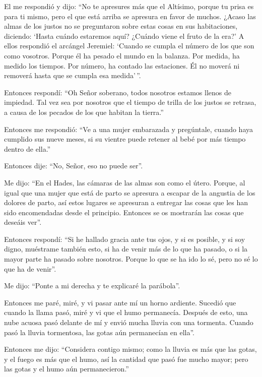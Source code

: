  El me respondió y dijo: ``No te apresures más que el
Altísimo, porque tu prisa es para ti mismo, pero el que está arriba se
apresura en favor de muchos.  ¿Acaso las almas de los
justos no se preguntaron sobre estas cosas en sus habitaciones,
diciendo: `Hasta cuándo estaremos aquí? ¿Cuándo viene el fruto de la
era?'  A ellos respondió el arcángel Jeremiel: `Cuando se
cumpla el número de los que son como vosotros. Porque él ha pesado el
mundo en la balanza.  Por medida, ha medido los tiempos.
Por número, ha contado las estaciones. Él no moverá ni removerá hasta
que se cumpla esa medida'\,''.

 Entonces respondí: ``Oh Señor soberano, todos nosotros
estamos llenos de impiedad.  Tal vez sea por nosotros que
el tiempo de trilla de los justos se retrasa, a causa de los pecados de
los que habitan la tierra.''

 Entonces me respondió: ``Ve a una mujer embarazada y
pregúntale, cuando haya cumplido sus nueve meses, si su vientre puede
retener al bebé por más tiempo dentro de ella.''

 Entonces dije: ``No, Señor, eso no puede ser''.

Me dijo: ``En el Hades, las cámaras de las almas son como el útero.
 Porque, al igual que una mujer que está de parto se
apresura a escapar de la angustia de los dolores de parto, así estos
lugares se apresuran a entregar las cosas que les han sido encomendadas
desde el principio.  Entonces se os mostrarán las cosas
que deseáis ver''.

 Entonces respondí: ``Si he hallado gracia ante tus ojos,
y si es posible, y si soy digno,  muéstrame también esto,
si ha de venir más de lo que ha pasado, o si la mayor parte ha pasado
sobre nosotros.  Porque lo que se ha ido lo sé, pero no
sé lo que ha de venir''.

 Me dijo: ``Ponte a mi derecha y te explicaré la
parábola''.

 Entonces me paré, miré, y vi pasar ante mí un horno
ardiente. Sucedió que cuando la llama pasó, miré y vi que el humo
permanecía.  Después de esto, una nube acuosa pasó
delante de mí y envió mucha lluvia con una tormenta. Cuando pasó la
lluvia tormentosa, las gotas aún permanecían en ella''.

 Entonces me dijo: ``Considera contigo mismo; como la
lluvia es más que las gotas, y el fuego es más que el humo, así la
cantidad que pasó fue mucho mayor; pero las gotas y el humo aún
permanecieron.''

